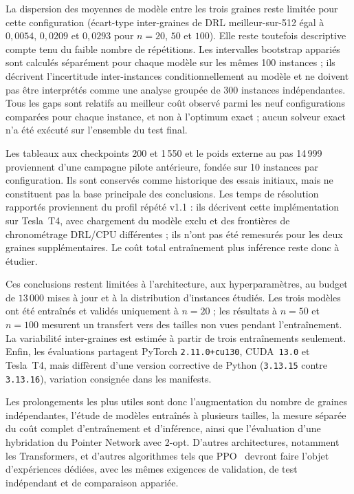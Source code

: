 \documentclass[12pt, a4paper, twoside, openright]{book}
\begin{document}
La dispersion des moyennes de modèle entre les trois graines reste limitée
pour cette configuration (écart-type inter-graines de DRL meilleur-sur-512
égal à $0{,}0054$, $0{,}0209$ et $0{,}0293$ pour $n=20$, $50$ et $100$). Elle
reste toutefois descriptive compte tenu du faible nombre de répétitions.
Les intervalles bootstrap appariés sont calculés séparément pour chaque modèle
sur les mêmes 100 instances ; ils décrivent l'incertitude inter-instances
conditionnellement au modèle et ne doivent pas être interprétés comme une
analyse groupée de 300 instances indépendantes. Tous les gaps sont relatifs
au meilleur coût observé parmi les neuf configurations comparées pour chaque
instance, et non à l'optimum exact ; aucun solveur exact n'a été exécuté sur
l'ensemble du test final.

Les tableaux aux checkpoints 200 et 1\,550 et le poids externe au pas 14\,999
proviennent d'une campagne pilote antérieure, fondée sur 10 instances par
configuration. Ils sont conservés comme historique des essais initiaux, mais
ne constituent pas la base principale des conclusions. Les temps de résolution
rapportés proviennent du profil répété v1.1 : ils décrivent cette implémentation
sur Tesla~T4, avec chargement du modèle exclu et des frontières de chronométrage
DRL/CPU différentes ; ils n'ont pas été remesurés pour les deux graines
supplémentaires. Le coût total entraînement plus inférence reste donc à
étudier.

Ces conclusions restent limitées à l'architecture, aux hyperparamètres, au
budget de $13\,000$ mises à jour et à la distribution d'instances étudiés.
Les trois modèles ont été entraînés et validés uniquement à $n=20$ ; les
résultats à $n=50$ et $n=100$ mesurent un transfert vers des tailles non vues
pendant l'entraînement. La variabilité inter-graines est estimée à partir de
trois entraînements seulement. Enfin, les évaluations partagent PyTorch
\texttt{2.11.0+cu130}, CUDA~\texttt{13.0} et Tesla~T4, mais diffèrent d'une
version corrective de Python (\texttt{3.13.15} contre \texttt{3.13.16}),
variation consignée dans les manifests.

Les prolongements les plus utiles sont donc l'augmentation du nombre de
graines indépendantes, l'étude de modèles entraînés à plusieurs tailles,
la mesure séparée du coût complet d'entraînement et d'inférence, ainsi que
l'évaluation d'une hybridation du Pointer Network avec 2-opt. D'autres
architectures, notamment les Transformers, et d'autres algorithmes tels que
PPO~\cite{schulman2017proximal} devront faire l'objet d'expériences dédiées,
avec les mêmes exigences de validation, de test indépendant et de comparaison
appariée.
\end{document}
